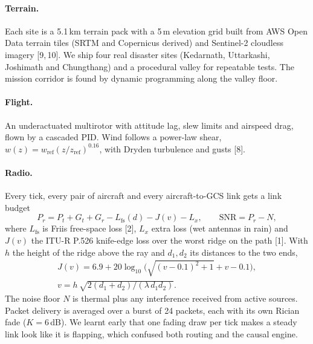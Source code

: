 \documentclass[10pt,a4paper,twocolumn]{article}
\begin{document}
\paragraph{Terrain.} Each site is a 5.1\,km terrain pack with a 5\,m elevation grid built from AWS Open Data terrain tiles (SRTM and Copernicus derived) and Sentinel-2 cloudless imagery [9,\,10]. We ship four real disaster sites (Kedarnath, Uttarkashi, Joshimath and Chungthang) and a procedural valley for repeatable tests. The mission corridor is found by dynamic programming along the valley floor.

\paragraph{Flight.} An underactuated multirotor with attitude lag, slew limits and airspeed drag, flown by a cascaded PID. Wind follows a power-law shear, $w(z)=w_{\mathrm{ref}}(z/z_{\mathrm{ref}})^{0.16}$, with Dryden turbulence and gusts [8].

\paragraph{Radio.} Every tick, every pair of aircraft and every aircraft-to-GCS link gets a link budget
\begin{equation}
P_r = P_t + G_t + G_r - L_{\mathrm{fs}}(d) - J(v) - L_x,\qquad \mathrm{SNR}=P_r-N,
\label{eq:budget}
\end{equation}
where $L_{\mathrm{fs}}$ is Friis free-space loss [2], $L_x$ extra loss (wet antennas in rain) and $J(v)$ the ITU-R P.526 knife-edge loss over the worst ridge on the path [1]. With $h$ the height of the ridge above the ray and $d_1,d_2$ its distances to the two ends,
\begin{equation}
\begin{gathered}
J(v)=6.9+20\log_{10}\!\Big(\sqrt{(v-0.1)^2+1}+v-0.1\Big),\\
v=h\,\sqrt{2(d_1+d_2)/(\lambda\, d_1 d_2)}.
\end{gathered}
\label{eq:knife}
\end{equation}
The noise floor $N$ is thermal plus any interference received from active sources. Packet delivery is averaged over a burst of 24 packets, each with its own Rician fade ($K=6$\,dB). We learnt early that one fading draw per tick makes a steady link look like it is flapping, which confused both routing and the causal engine.

\end{document}
